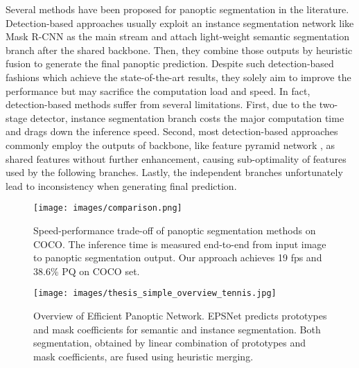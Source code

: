 \documentclass[runningheads]{llncs}
\begin{document}
Several methods \cite{Xiong2019,Sofiiuk2019,Yang2019a,Liu2019,Li2018c,DeGeus2018a} have been proposed for panoptic segmentation in the literature. Detection-based approaches \cite{Xiong2019,Liu2019,Li2018c,DeGeus2018a} usually exploit an instance segmentation network like Mask R-CNN \cite{He2017} as the main stream and attach light-weight semantic segmentation branch after the shared backbone. Then, they combine those outputs by heuristic fusion \cite{Li2018} to generate the final panoptic prediction. Despite such detection-based fashions which achieve the state-of-the-art results, they solely aim to improve the performance but may sacrifice the computation load and speed. In fact, detection-based methods suffer from several limitations. First, due to the two-stage detector, instance segmentation branch costs the major computation time and drags down the inference speed. Second, most detection-based approaches commonly employ the outputs of backbone, like feature pyramid network \cite{Lin2017}, as shared features without further enhancement, causing sub-optimality of features used by the following branches.
Lastly, the independent branches unfortunately lead to inconsistency when generating final prediction.
\begin{figure}[t]
    \begin{minipage}{0.45\textwidth}
    \texttt{[image: images/comparison.png]}
    \caption{Speed-performance trade-off of panoptic segmentation methods on COCO. The inference time is measured end-to-end from input image to panoptic segmentation output. Our approach achieves 19 fps and 38.6\% PQ on COCO  set. }
    \label{fig:sp_tradeoff}
    \end{minipage}
    \hspace{.02\textwidth}
    \begin{minipage}{0.5\textwidth}
    \texttt{[image: images/thesis\_simple\_overview\_tennis.jpg]}
    \caption{Overview of Efficient Panoptic Network. EPSNet predicts prototypes and mask coefficients for semantic and instance segmentation. Both segmentation, obtained by linear combination of prototypes and mask coefficients, are fused using heuristic merging. }
    \label{fig:simple_overview}
    \end{minipage}
\end{figure}
\end{document}
